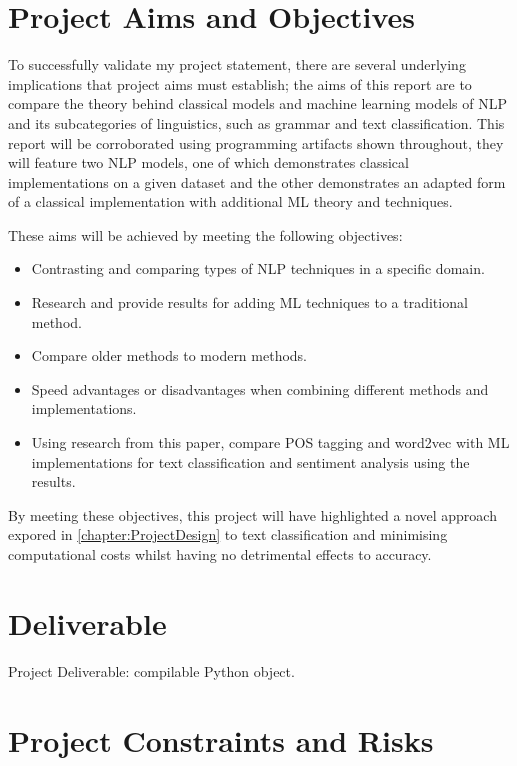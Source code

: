 \section{Project Aims and Objectives}

To successfully validate my project statement, there are several underlying implications that project aims must establish; the aims of this report are to compare the theory behind classical models and machine learning models of NLP and its subcategories of linguistics, such as grammar and text classification. This report will be corroborated using programming artifacts shown throughout, they will feature two NLP models, one of which demonstrates classical implementations on a given dataset and the other demonstrates an adapted form of a classical implementation with additional ML theory and techniques.

These aims will be achieved by meeting the following objectives:

\begin{itemize}
    \item Contrasting and comparing types of NLP techniques in a specific domain.
    \item Research and provide results for adding ML techniques to a traditional method.
	\item Compare older methods to modern methods.
	\item Speed advantages or disadvantages when combining different methods and implementations.
	\item Using research from this paper, compare POS tagging and word2vec with ML implementations for text classification and sentiment analysis using the results.
\end{itemize}

By meeting these objectives, this project will have highlighted a novel approach expored in \autoref{chapter:ProjectDesign} to text classification and minimising computational costs whilst having no detrimental effects to accuracy.

\section{Deliverable}

Project Deliverable: compilable Python object.

\section{Project Constraints and Risks}

